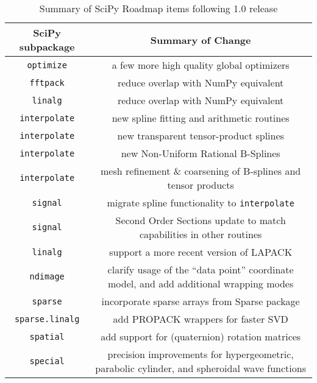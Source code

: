 \documentclass[fleqn,10pt]{wlscirep}
\begin{document}
%

\begin{table}[H]
\caption{Summary of SciPy Roadmap items following 1.0 release}
\begin{tabular}{ c|c }
    SciPy subpackage & Summary of Change \\
    \hline
    \texttt{optimize} & a few more high quality global optimizers\\
    \texttt{fftpack} & reduce overlap with NumPy equivalent \\
    \texttt{linalg} & reduce overlap with NumPy equivalent \\
    \texttt{interpolate} & new spline fitting and arithmetic routines \\
    \texttt{interpolate} & new transparent tensor-product splines\\
    \texttt{interpolate} & new Non-Uniform Rational B-Splines\\
    \texttt{interpolate} & mesh refinement \& coarsening of B-splines and tensor products\\
    \texttt{signal} & migrate spline functionality to \texttt{interpolate}\\
    \texttt{signal} & Second Order Sections update to match capabilities in other routines\\
    \texttt{linalg} & support a more recent version of LAPACK\\
    \texttt{ndimage} & clarify usage of the ``data point'' coordinate
    model, and add additional wrapping modes\\
    \texttt{sparse} & incorporate sparse arrays from Sparse package\cite{abbasi2018sparse} \\
    \texttt{sparse.linalg} & add PROPACK wrappers for faster SVD\\
    \texttt{spatial} & add support for (quaternion) rotation matrices\\
    \texttt{special} & precision improvements for hypergeometric, parabolic cylinder, and spheroidal wave functions\\
\end{tabular}\label{table:roadmap}
\end{table}
\end{document}
